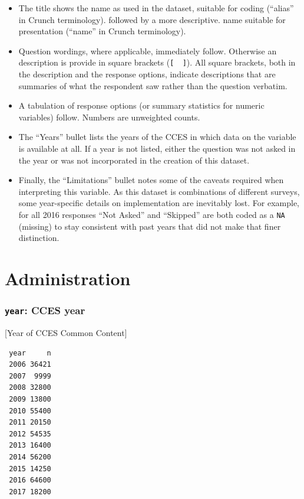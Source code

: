 \documentclass[10pt,article,oneside]{memoir}
\theoremstyle{definition}
\begin{document}
\begin{itemize}
\tightlist
\item
  The title shows the name as used in the dataset, suitable for coding
  (``alias'' in Crunch terminology). followed by a more descriptive.
  name suitable for presentation (``name'' in Crunch terminology).
\item
  Question wordings, where applicable, immediately follow. Otherwise an
  description is provide in square brackets (\texttt{{[}\ \ {]}}). All
  square brackets, both in the description and the response options,
  indicate descriptions that are summaries of what the respondent saw
  rather than the question verbatim.
\item
  A tabulation of response options (or summary statistics for numeric
  variables) follow. Numbers are unweighted counts.
\item
  The ``Years'' bullet lists the years of the CCES in which data on the
  variable is available at all. If a year is not listed, either the
  question was not asked in the year or was not incorporated in the
  creation of this dataset.
\item
  Finally, the ``Limitations'' bullet notes some of the caveats required
  when interpreting this variable. As this dataset is combinations of
  different surveys, some year-specific details on implementation are
  inevitably lost. For example, for all 2016 responses ``Not Asked'' and
  ``Skipped'' are both coded as a \texttt{NA} (missing) to stay
  consistent with past years that did not make that finer distinction.
\end{itemize}

\section{Administration}\label{administration}

\subsubsection{\texorpdfstring{\texttt{year}: CCES
year}{year: CCES year}}\label{year-cces-year}

{[}Year of CCES Common Content{]}

\begin{verbatim}
 year     n
 2006 36421
 2007  9999
 2008 32800
 2009 13800
 2010 55400
 2011 20150
 2012 54535
 2013 16400
 2014 56200
 2015 14250
 2016 64600
 2017 18200
\end{verbatim}
\end{document}
